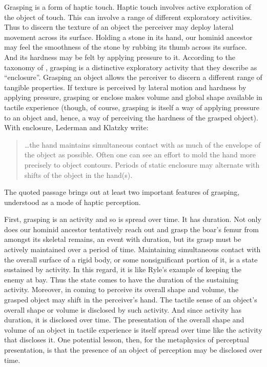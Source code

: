 \documentclass[12pt]{article}
\begin{document}
Grasping is a form of haptic touch. Haptic touch involves active exploration of the object of touch. This can involve a range of different exploratory activities. Thus to discern the texture of an object the perceiver may deploy lateral movement across its surface. Holding a stone in its hand, our hominid ancestor may feel the smoothness of the stone by rubbing its thumb across its surface. And its hardness may be felt by applying pressure to it. According to the taxonomy of \citet{Lederman:1987fr}, grasping is a distinctive exploratory activity that they describe as ``enclosure''. Grasping an object allows the perceiver to discern a different range of tangible properties. If texture is perceived by lateral motion and hardness by applying pressure, grasping or enclose makes volume and global shape available in tactile experience (though, of course, grasping is itself a way of applying pressure to an object and, hence, a way of perceiving the hardness of the grasped object). With enclosure, Lederman and Klatzky write:
\begin{quote}
	\ldots the hand maintains simultaneous contact with as much of the envelope of the object as possible. Often one can see an effort to mold the hand more precisely to object contours. Periods of static enclosure may alternate with shifts of the object in the hand(s). \citep[346--7]{Lederman:1987fr}
\end{quote}
The quoted passage brings out at least two important features of grasping, understood as a mode of haptic perception. 

First, grasping is an activity and so is spread over time. It has duration. Not only does our hominid ancestor tentatively reach out and grasp the boar's femur from amongst its skeletal remains, an event with duration, but its grasp must be actively maintained over a period of time. Maintaining simultaneous contact with the overall surface of a rigid body, or some nonsignificant portion of it, is a state sustained by activity. In this regard, it is like Ryle's \citeyearpar[149]{Ryle:1949qr} example of keeping the enemy at bay. Thus the state comes to have the duration of the sustaining activity. Moreover, in coming to perceive its overall shape and volume, the grasped object may shift in the perceiver's hand. The tactile sense of an object's overall shape or volume is disclosed by such activity. And since activity has duration, it is disclosed over time. The presentation of the overall shape and volume of an object in tactile experience is itself spread over time like the activity that discloses it. One potential lesson, then, for the metaphysics of perceptual presentation, is that the presence of an object of perception may be disclosed over time. 
\end{document}

